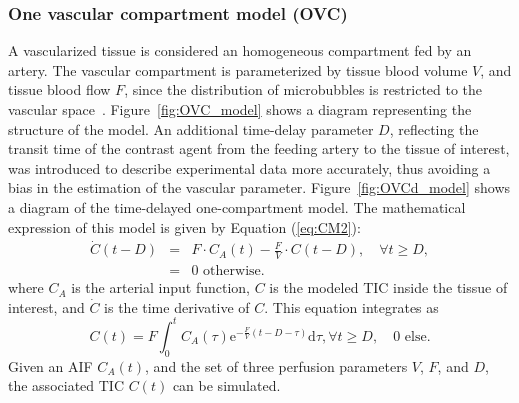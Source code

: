 \subsubsection{One vascular compartment model (OVC)}
\label{sec:OVCModel}
A vascularized tissue is considered an homogeneous compartment fed by an artery.
The vascular compartment is parameterized by tissue blood volume $V$, and tissue blood flow $F$, since the distribution of microbubbles is restricted to the vascular space~\cite{Gunn:2001cx,Doury:2017fz}.
Figure~\ref{fig:OVC_model} shows a diagram representing the structure of the model.
An additional time-delay parameter $D$, reflecting the transit time of the contrast agent from the feeding artery to the tissue of interest, was introduced to describe experimental data more accurately, thus avoiding a bias in the estimation of the vascular parameter. 
Figure~\ref{fig:OVCd_model} shows a diagram of the time-delayed one-compartment model.
The mathematical expression of this model is given by Equation (\ref{eq:CM2}):
\begin{equation}
\begin{array}{rcl}
\dot{C} \left( t - D \right) &=& F \cdot C_A \left( t \right) - \frac{F}{V} \cdot C \left( t - D \right), \quad \forall t \geq D,  \\
 &=& 0 \textrm{ otherwise.} 
\end{array}
\label{eq:CM}
\end{equation}
where $C_A$ is the arterial input function, $C$ is the modeled TIC inside the tissue of interest, and $\dot{C}$ is the time derivative of $C$.
This equation integrates as 
\begin{equation}
C \left( t \right) = F \int_{0}^{t} C_A \left( \tau \right) \mathrm{e}^{-\frac{F}{V} \left( t - D - \tau \right)}\mathrm d \tau, \forall t \geq D, \quad 0 \textrm{ else.}
\label{eq:CM2}
\end{equation}
Given an AIF $C_A(t)$, and the set of three perfusion parameters $V$, $F$, and $D$, the associated TIC $C(t)$ can be simulated.

